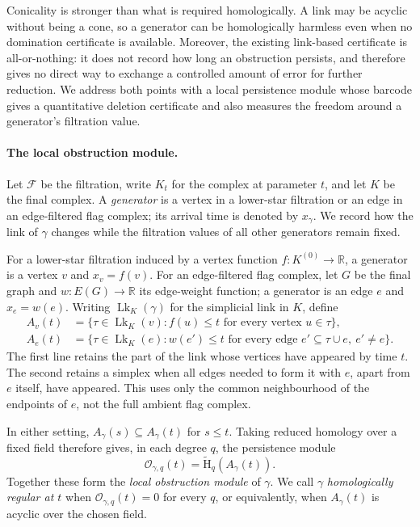\documentclass[11pt,letterpaper]{article}
\theoremstyle{definition}
\newcommand{\redH}{\widetilde{\mathrm H}}
\newcommand{\lk}{\operatorname{Lk}}
\newcommand{\Oc}{\mathcal O}
\begin{document}
Conicality is stronger than what is required homologically. A link may be
acyclic without being a cone, so a generator can be homologically harmless
even when no domination certificate is available. Moreover, the existing
link-based certificate is all-or-nothing: it does not record how long an
obstruction persists, and therefore gives no direct way to exchange a
controlled amount of error for further reduction. We address both points with
a local persistence module whose barcode gives a quantitative deletion
certificate and also measures the freedom around a generator's filtration
value.

\paragraph{The local obstruction module.}
Let $\mathcal F$ be the filtration, write $K_t$ for the complex at parameter
$t$, and let $K$ be the final complex. A \emph{generator} is a vertex in a
lower-star filtration or an edge in an edge-filtered flag complex; its arrival
time is denoted by $x_\gamma$. We record how the link of $\gamma$ changes while
the filtration values of all other generators remain fixed.

For a lower-star filtration induced by a vertex function
$f:K^{(0)}\to\mathbb R$, a generator is a vertex $v$ and $x_v=f(v)$. For an
edge-filtered flag complex, let $G$ be the final graph and
$w:E(G)\to\mathbb R$ its edge-weight function; a generator is an edge $e$ and
$x_e=w(e)$. Writing $\lk_K(\gamma)$ for the simplicial link in $K$, define
$$
\begin{aligned}
A_v(t)
&=\{\tau\in\lk_K(v):f(u)\leq t
      \text{ for every vertex }u\in\tau\},\\
A_e(t)
&=\{\tau\in\lk_K(e):w(e')\leq t
      \text{ for every edge }e'\subseteq\tau\cup e,\ e'\neq e\}.
\end{aligned}
$$
The first line retains the part of the link whose vertices have appeared by
time $t$. The second retains a simplex when all edges needed to form it with
$e$, apart from $e$ itself, have appeared. This uses only the common
neighbourhood of the endpoints of $e$, not the full ambient flag complex.

In either setting, $A_\gamma(s)\subseteq A_\gamma(t)$ for $s\leq t$. Taking
reduced homology over a fixed field therefore gives, in each degree $q$, the
persistence module
$$
\Oc_{\gamma,q}(t)=\redH_q(A_\gamma(t)).
$$
Together these form the \emph{local obstruction module} of $\gamma$. We call
$\gamma$ \emph{homologically regular at $t$} when
$\Oc_{\gamma,q}(t)=0$ for every $q$, or equivalently, when $A_\gamma(t)$ is
acyclic over the chosen field.
\end{document}
